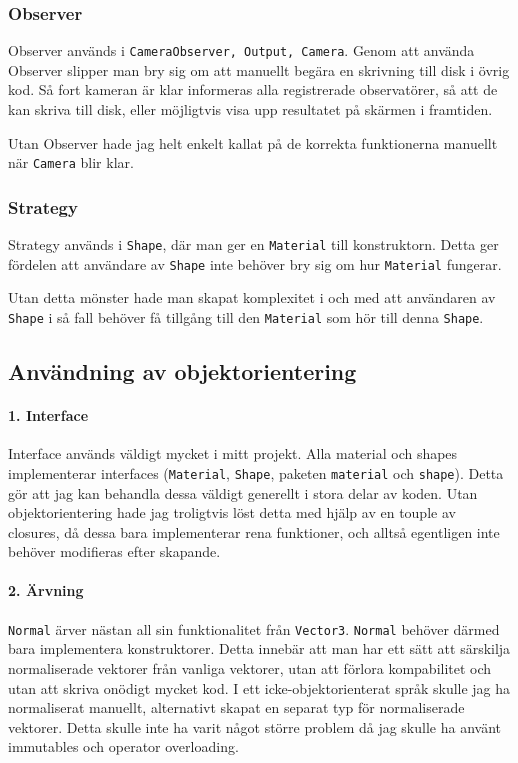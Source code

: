 \documentclass{article}
\begin{document}
\subsubsection{Observer}
Observer används i \texttt{CameraObserver, Output, Camera}. Genom att
använda Observer slipper man bry sig om att manuellt begära en
skrivning till disk i övrig kod. Så fort kameran är klar informeras
alla registrerade observatörer, så att de kan skriva till disk, eller
möjligtvis visa upp resultatet på skärmen i framtiden.

Utan Observer hade jag helt enkelt kallat på de korrekta funktionerna
manuellt när \texttt{Camera} blir klar.

\subsubsection{Strategy}
Strategy används i \texttt{Shape}, där man ger en \texttt{Material}
till konstruktorn.  Detta ger fördelen att användare av \texttt{Shape}
inte behöver bry sig om hur \texttt{Material} fungerar.

Utan detta mönster hade man skapat komplexitet i och med att
användaren av \texttt{Shape} i så fall behöver få tillgång till den
\texttt{Material} som hör till denna \texttt{Shape}.


\subsection{Användning av objektorientering}
\paragraph{1. Interface}
Interface används väldigt mycket i mitt projekt. Alla material och
shapes implementerar interfaces (\texttt{Material}, \texttt{Shape},
paketen \texttt{material} och \texttt{shape}). Detta gör att jag kan
behandla dessa väldigt generellt i stora delar av koden. Utan
objektorientering hade jag troligtvis löst detta med hjälp av en
touple av closures, då dessa bara implementerar rena funktioner, och
alltså egentligen inte behöver modifieras efter skapande.

\paragraph{2. Ärvning}
\texttt{Normal} ärver nästan all sin funktionalitet från
\texttt{Vector3}. \texttt{Normal} behöver därmed bara implementera
konstruktorer. Detta innebär att man har ett sätt att särskilja
normaliserade vektorer från vanliga vektorer, utan att förlora
kompabilitet och utan att skriva onödigt mycket kod. I ett
icke-objektorienterat språk skulle jag ha normaliserat manuellt,
alternativt skapat en separat typ för normaliserade vektorer. Detta
skulle inte ha varit något större problem då jag skulle ha använt
immutables och operator overloading.
\end{document}
